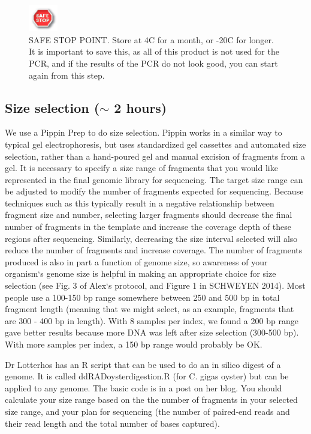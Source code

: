 \documentclass[11pt, oneside]{article}
\begin{document}
	\begin{figure}[h]
			\includegraphics[width=0.5in]{./images/Safe_Stop.pdf}
			\caption[ddRAD Safe Stop after pooling]{SAFE STOP POINT.  Store at 4C for a month, or -20C for longer.  It is important to save this, as all of this product is not used for the PCR, and if the results of the PCR do not look good, you can start again from this step.}
		\end{figure}

\clearpage

\subsection{ Size selection ($\sim$ 2 hours)}
 We use a Pippin Prep to do size selection. Pippin works in a similar way to typical gel electrophoresis, but uses standardized gel cassettes and automated size selection, rather than a hand-poured gel and manual excision of fragments from a gel. It is necessary to specify a size range of fragments that you would like represented in the final genomic library for sequencing. The target size range can be adjusted to modify the number of fragments expected for sequencing. Because techniques such as this typically result in a negative relationship between fragment size and number, selecting larger fragments should decrease the final number of fragments in the template and increase the coverage depth of these regions after sequencing. Similarly, decreasing the size interval selected will also reduce the number of fragments and increase coverage. The number of fragments produced is also in part a function of genome size, so awareness of your organism`s genome size is helpful in making an appropriate choice for size selection (see Fig. 3 of Alex`s protocol, and Figure 1 in SCHWEYEN 2014).  Most people use a 100-150 bp range somewhere between 250 and 500 bp in total fragment length (meaning that we might select, as an example, fragments that are 300 - 400 bp in length).  With 8 samples per index, we found a 200 bp range gave better results because more DNA was left after size selection (300-500 bp).  With more samples per index, a 150 bp range would probably be OK.

Dr Lotterhos has an R script that can be used to do an in silico digest of a genome.  It is called ddRADoysterdigestion.R (for C. gigas oyster) but can be applied to any genome.  The basic code is in a post on her blog.  You should calculate your size range based on the the number of fragments in your selected size range, and your plan for sequencing (the number of paired-end reads and their read length and the total number of bases captured).
\end{document}
